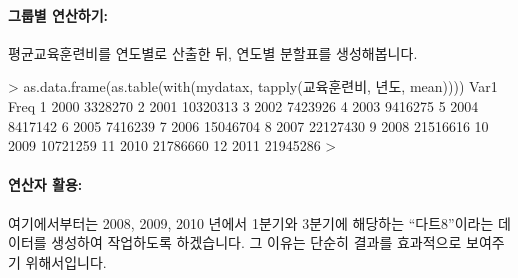 \paragraph{그룹별 연산하기:}
평균교육훈련비를 연도별로 산출한 뒤, 연도별 분할표를 생성해봅니다.

\begin{Schunk}
\begin{Soutput}
> as.data.frame(as.table(with(mydatax, tapply(교육훈련비, 년도, mean))))
   Var1     Freq
1  2000  3328270
2  2001 10320313
3  2002  7423926
4  2003  9416275
5  2004  8417142
6  2005  7416239
7  2006 15046704
8  2007 22127430
9  2008 21516616
10 2009 10721259
11 2010 21786660
12 2011 21945286
> 
\end{Soutput}
\end{Schunk}

\paragraph{연산자 활용:}
여기에서부터는 2008, 2009, 2010 년에서 1분기와 3분기에 해당하는 ``다트8''이라는 데이터를 생성하여 작업하도록 하겠습니다.
그 이유는 단순히 결과를 효과적으로 보여주기 위해서입니다.

